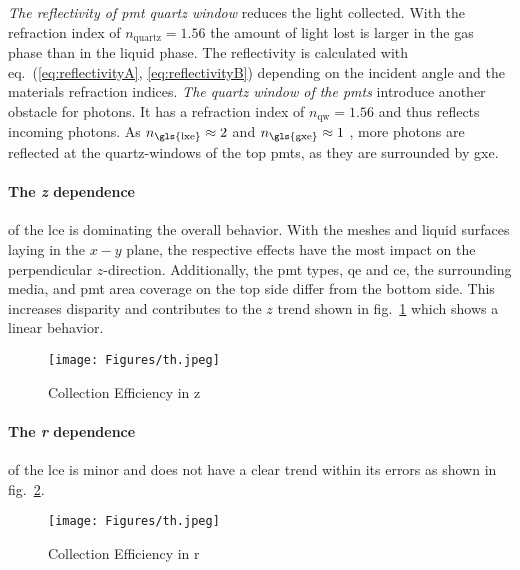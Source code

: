 \emph{The reflectivity of \gls{pmt} quartz window} reduces the light collected. With the refraction index of $ n_\mathrm{quartz} = 1.56 $ the amount of light lost is larger in the gas phase than in the liquid phase. The reflectivity is calculated with eq.~(\ref{eq:reflectivityA}, \ref{eq:reflectivityB}) depending on the incident angle and the materials refraction indices.
\emph{The quartz window of the \glspl{pmt}} introduce another obstacle for photons.
It has a refraction index of $ n_\mathrm{qw} = 1.56 $ and thus reflects incoming photons.
As $ n_\mathrm{\gls{lxe}} \approx 2 $ and $ n_\mathrm{\gls{gxe}} \approx 1 $ , more photons are reflected at the quartz-windows of the top \glspl{pmt}, as they are surrounded by \gls{gxe}.


\paragraph{The \emph{z} dependence} of the \gls{lce} is dominating the overall behavior.
With the meshes and liquid surfaces laying in the $ x-y $ plane, the respective effects have the most impact on the perpendicular $ z $-direction.
Additionally, the \gls{pmt} types, \gls{qe} and \gls{ce}, the surrounding media, and \gls{pmt} area coverage on the top side differ from the bottom side.
This increases disparity and contributes to the $ z $ trend shown in fig.~\ref{fig:ce_vs_z} which shows a linear behavior.


\begin{figure}
\centering
\texttt{[image: Figures/th.jpeg]}  %
\caption[Collection Efficiency in z]{
        Collection Efficiency in z
    }
\label{fig:ce_vs_z}
\end{figure}

\paragraph{The \emph{r} dependence} of the \gls{lce} is minor and does not have a clear trend within its errors as shown in fig.~\ref{fig:ce_vs_r}.

\begin{figure}
\centering
    \texttt{[image: Figures/th.jpeg]}  %
\caption[Collection Efficiency in r]{
    Collection Efficiency in r
    }
\label{fig:ce_vs_r}
\end{figure}

